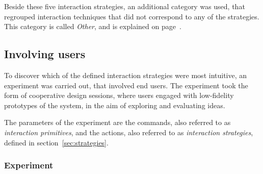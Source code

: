Beside these five interaction strategies, an additional category was used, that regrouped interaction techniques that did not correspond to any of the strategies.
This category is called \emph{Other}, and is explained on page~\pageref{other}.


\subsection{Involving users}

To discover which of the defined interaction strategies were most intuitive, an experiment was carried out, that involved end users.
The experiment took the form of cooperative design sessions, where users engaged with low-fidelity prototypes of the system, in the aim of exploring and evaluating ideas.

The parameters of the experiment are the commands, also referred to as \emph{interaction primitives}, and the actions, also referred to as \emph{interaction strategies}, defined in section~\ref{sec:strategies}.


\subsubsection{Experiment}

